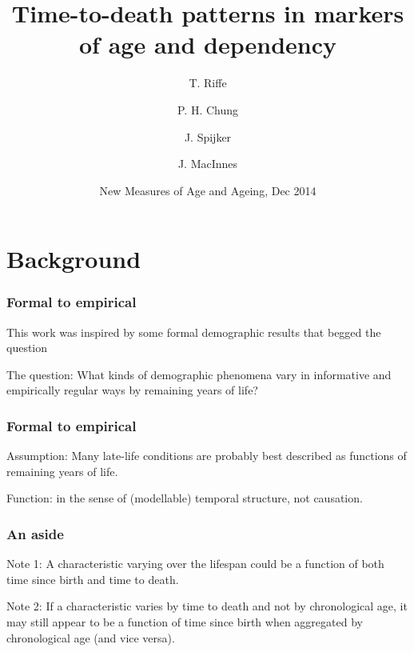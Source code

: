 \documentclass{beamer}
\title[TTD markers]{Time-to-death patterns in markers of age and dependency}
\author[Riffe et. al.]
{
T. Riffe \inst{1} \and P. H. Chung \inst{1} \and J. Spijker \inst{2} \and J.
MacInnes \inst{3} }
\institute[VFU] %
{
  \inst{1}%
  Department of Demography\\
  University of California, Berkeley
  \and
  \inst{2}%
  Wittgenstein Centre (IIASA, VID/\"OAW, WU), Vienna Institute of
  Demography/Austrian Academy of Sciences
  \and
  \inst{3}
  School of Social and Political Science\\
  University of Edinburgh
}
\date[Dec 2014] %
{New Measures of Age and Ageing, Dec 2014}
\begin{document}
\begin{frame}
\titlepage %
\end{frame}

\section{Background} %

\begin{frame}
\frametitle{Formal to empirical}
This work was inspired by some formal demographic results that begged the question
\begin{block}{The question:}
What kinds of demographic phenomena vary in informative and empirically regular
ways by remaining years of life?
\end{block}
\end{frame}


\begin{frame}
\frametitle{Formal to empirical}
\begin{block}{Assumption:}
Many late-life conditions are probably best described as
functions of remaining years of life.
\end{block}
\vspace{1em}
\begin{block}{Function:}
in the sense of (modellable) temporal structure, not causation.
\end{block}
\end{frame}


\begin{frame}
\frametitle{An aside}
\begin{block}{Note 1:}
A characteristic varying over the lifespan could be a function of both time
since birth and time to death.
\end{block}
\begin{block}{Note 2:}
If a characteristic varies by time to death and not by chronological age, it may
still appear to be a function of time since birth when aggregated by chronological
age (and vice versa).
\end{block}
\end{frame}

\end{document}
